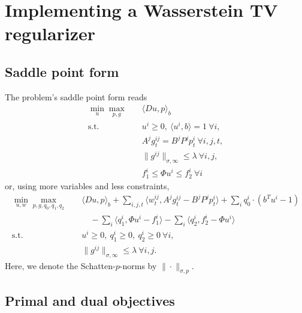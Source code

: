 
\section{Implementing a Wasserstein TV regularizer}

\subsection{Saddle point form}

The problem's saddle point form reads
\begin{align*}
    \min_{u} \max_{p,g} \quad
        & \langle Du, p \rangle_b \\
    \text{s.t.}\quad 
        & u^i \geq 0, ~\langle u^i, b \rangle = 1 ~\forall i, \\
        & A^j g^{ij}_t = B^j P^j p^i_t ~\forall i,j,t, \\
        & \|g^{ij}\|_{\sigma,\infty} \leq \lambda ~\forall i,j, \\
        & f_1^i \leq \Phi u^i \leq f_2^i ~\forall i
\end{align*}
or, using more variables and less constraints,
\begin{align*}
    \min_{u, w} \max_{p,g,q_0,q_1,q_2} \quad
        & \langle Du, p \rangle_b
            + \sum_{i,j,t} \langle w^{ij}_t, A^j g^{ij}_t - B^j P^j p^i_t \rangle
            + \sum_{i} q_0^i \cdot (b^T u^i - 1)
            \\
        &\quad - \sum_{i} \langle q_1^i, \Phi u^i - f_1^i \rangle
            - \sum_{i} \langle q_2^i, f_2^i - \Phi u^i \rangle\\
    \text{s.t.}\quad 
        & u^i \geq 0, ~q_1^i \geq 0, ~q_2^i \geq 0 ~\forall i, \\
        & \|g^{ij}\|_{\sigma,\infty} \leq \lambda ~\forall i,j.
\end{align*}
Here, we denote the Schatten-$p$-norms by $\|\cdot\|_{\sigma,p}$.

\subsection{Primal and dual objectives}

